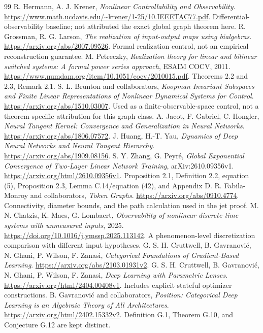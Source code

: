\documentclass[11pt]{article}
\theoremstyle{remark}
\begin{document}
\begin{thebibliography}{99}
 R. Hermann, A. J. Krener, \emph{Nonlinear Controllability and Observability}. \url{https://www.math.ucdavis.edu/~krener/1-25/10.IEEETAC77.pdf}. Differential-observability baseline; not attributed the exact global graph theorem here.
 R. Grossman, R. G. Larson, \emph{The realization of input-output maps using bialgebras}. \url{https://arxiv.org/abs/2007.09526}. Formal realization control, not an empirical reconstruction guarantee.
 M. Petreczky, \emph{Realization theory for linear and bilinear switched systems: A formal power series approach}, ESAIM COCV, 2011. \url{https://www.numdam.org/item/10.1051/cocv/2010015.pdf}. Theorems 2.2 and 2.3, Remark 2.1.
 S. L. Brunton and collaborators, \emph{Koopman Invariant Subspaces and Finite Linear Representations of Nonlinear Dynamical Systems for Control}. \url{https://arxiv.org/abs/1510.03007}. Used as a finite-observable-space control, not a theorem-specific attribution for this graph class.
 A. Jacot, F. Gabriel, C. Hongler, \emph{Neural Tangent Kernel: Convergence and Generalization in Neural Networks}. \url{https://arxiv.org/abs/1806.07572}.
 J. Huang, H.-T. Yau, \emph{Dynamics of Deep Neural Networks and Neural Tangent Hierarchy}. \url{https://arxiv.org/abs/1909.08156}.
 S. Y. Zhang, G. Peyr\'e, \emph{Global Exponential Convergence of Two-Layer Linear Network Training}, arXiv:2610.09356v1. \url{https://arxiv.org/html/2610.09356v1}. Proposition 2.1, Definition 2.2, equation (5), Proposition 2.3, Lemma C.14/equation (42), and Appendix D.
 R. Fabila-Monroy and collaborators, \emph{Token Graphs}. \url{https://arxiv.org/abs/0910.4774}. Connectivity, diameter bounds, and the path calculation used in the jet proof.
 M. N. Chatzis, K. Maes, G. Lombaert, \emph{Observability of nonlinear discrete-time systems with unmeasured inputs}, 2025. \url{https://doi.org/10.1016/j.ymssp.2025.113142}. A phenomenon-level discretization comparison with different input hypotheses.
 G. S. H. Cruttwell, B. Gavranovi\'{c}, N. Ghani, P. Wilson, F. Zanasi, \emph{Categorical Foundations of Gradient-Based Learning}. \url{https://arxiv.org/abs/2103.01931v2}.
 G. S. H. Cruttwell, B. Gavranovi\'{c}, N. Ghani, P. Wilson, F. Zanasi, \emph{Deep Learning with Parametric Lenses}. \url{https://arxiv.org/html/2404.00408v1}. Includes explicit stateful optimizer constructions.
 B. Gavranovi\'{c} and collaborators, \emph{Position: Categorical Deep Learning is an Algebraic Theory of All Architectures}. \url{https://arxiv.org/html/2402.15332v2}. Definition G.1, Theorem G.10, and Conjecture G.12 are kept distinct.
\end{thebibliography}
\end{document}
